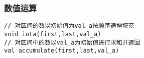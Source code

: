 \subsubsection{数值运算}
\begin{lstlisting}
// 对区间的数以初始值为val_a按顺序递增填充
void iota(first,last,val_a)
// 对区间中的数以val_a为初始值进行求和并返回
val accumulate(first,last,val_a)
\end{lstlisting}